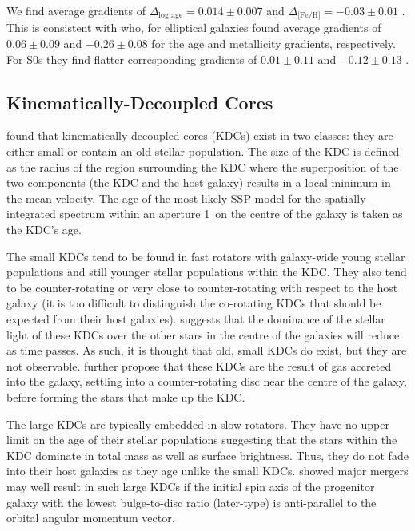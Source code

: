 			We find average gradients of $\Delta_\text{log age} = 0.014\pm0.007$%
			 and $\Delta_\text{[Fe/H]} = -0.03\pm0.01$%
			. This is consistent with \citet{Koleva2011} who, for elliptical galaxies found average gradients of $0.06\pm0.09$%
			 and $-0.26\pm0.08$%
			 for the age and metallicity gradients, respectively. For S0s they find flatter corresponding gradients of $0.01\pm0.11$%
			 and $-0.12\pm0.13$%
			. 




	\subsection{Kinematically-Decoupled Cores}
		\label{subsec:popKDC}

		\citet{Kuntschner2010} found that kinematically-decoupled cores (KDCs) exist in two classes: they are either small or contain an old stellar population. The size of the KDC is defined as the radius of the region surrounding the KDC where the superposition of the two components (the KDC and the host galaxy) results in a local minimum in the mean velocity. The age of the most-likely SSP model for the spatially integrated spectrum within an aperture 1\arcsec\ on the centre of the galaxy is taken as the KDC's age.

		The small KDCs tend to be found in fast rotators with galaxy-wide young stellar populations and still younger stellar populations within the KDC. They also tend to be counter-rotating or very close to counter-rotating with respect to the host galaxy (it is too difficult to distinguish the co-rotating KDCs that should be expected from their host galaxies). \citet{Kuntschner2010} suggests that the dominance of the stellar light of these KDCs over the other stars in the centre of the galaxies will reduce as time passes. As such, it is thought that old, small KDCs do exist, but they are not observable. \citet{Kuntschner2010} further propose that these KDCs are the result of gas accreted into the galaxy, settling into a counter-rotating disc near the centre of the galaxy, before forming the stars that make up the KDC. 

		The large KDCs are typically embedded in slow rotators. They have no upper limit on the age of their stellar populations suggesting that the stars within the KDC dominate in total mass as well as surface brightness. Thus, they do not fade into their host galaxies as they age unlike the small KDCs. \citet{Bois2011} showed major mergers may well result in such large KDCs if the initial spin axis of the progenitor galaxy with the lowest bulge-to-disc ratio (later-type) is anti-parallel to the orbital angular momentum vector. 

